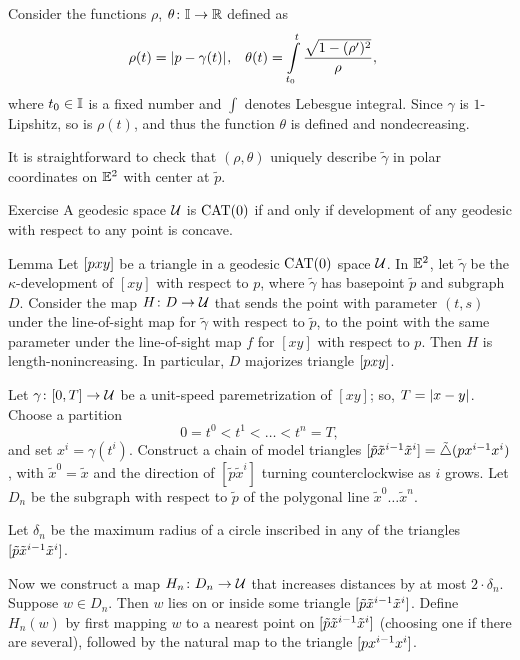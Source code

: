 Consider the functions $\rho$, $\theta\colon\mathbb{I}\to\mathbb{R}$ defined as 
\begin{align*}
\rho(t)
&=\dist{p}{\gamma(t)}{},
&
\theta(t)
&=
\int\limits_{t_0}^{t}\frac{\sqrt{1-(\rho')^2}}{\rho},
\end{align*}
where $t_0\in\mathbb{I}$ is a fixed number and $\int$ denotes Lebesgue integral.
Since $\gamma$ is $1$-Lipshitz, so is $\rho(t)$, and thus the function $\theta$ is defined and nondecreasing.

It is straightforward to check that $(\rho,\theta)$ uniquely describe $\tilde \gamma$ in polar coordinates on $\mathbb{E}^2$ with center at $\tilde p$.
\qeds

\begin{thm}{Exercise}\label{ex:devel-comp-CAT}
A geodesic space $\mathcal{U}$ is $\mathrm{CAT}(0)$ if and only if development of any geodesic with respect to any point is concave. 
\end{thm}



\begin{thm}{Lemma}\label{lem:majorize-triangle}
Let $[pxy]$ be a triangle in a geodesic $\mathrm{CAT}(0)$ space $\mathcal{U}$.
In $\mathbb{E}^2$, let $\tilde \gamma$ be the $\kappa$-development of $[x y]$ with respect to $p$, where $\tilde \gamma$ has basepoint $\tilde p$ and subgraph $D$.
Consider the map $H\colon D\to\mathcal{U}$ that sends the point with parameter $(t,s)$ under the line-of-sight map for $\tilde \gamma$ with respect to $\tilde p$, to the point with the same parameter under the line-of-sight map $f$ for $[x y]$ with respect to $p$.
Then $H$ is  length-nonincreasing.
In particular, $D$ majorizes triangle $[pxy]$.
\end{thm}

Let $\gamma\colon[0,T]\to \mathcal{U}$ be a unit-speed paremetrization of $[xy]$; so, $T=\dist{x}{y}{}$. 
Choose a partition 
\[0=t^0<t^1<\dots<t^n=T,\]
and set $x^i=\gamma(t^i)$. 
Construct a chain of model triangles  $\trig{\tilde p}{\tilde x^{i-1}}{\tilde x^i}\z=
\modtrig(p x^{i-1} {x^i})$, with $\tilde x^0=\tilde x$ and the direction of $[\tilde p\tilde x^i]$ turning counterclockwise as $i$ grows.  
Let $D_n$ be the subgraph with respect to $\tilde p$ of the polygonal line $\tilde x^0\dots \tilde x^n$.


Let  $\delta_n$ be the maximum radius of a circle inscribed in any of the triangles $[\tilde p\tilde x^{i-1}\tilde x^i]$.  

Now we construct a map $H_n \colon D_n\to\mathcal{U}$  that increases distances by at most  $2\cdot\delta_n$.
Suppose $w\in D_n$.
Then $w$ lies on or inside some triangle $[\tilde p\tilde x^{i-1}\tilde x^i]$.  
Define $H_n(w)$ by first mapping $w$ to a nearest point on $[\tilde p\tilde x^{i-1}\tilde x^i]$ (choosing one if there are several), followed by the natural map to the triangle  $[px^{i-1} x^i]$. 

